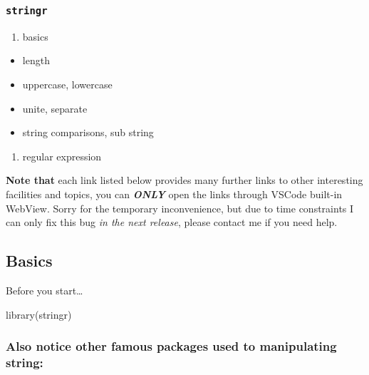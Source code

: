 \documentclass[
]{article}
\newenvironment{Shaded}{}{}
\newcommand{\FunctionTok}[1]{\textcolor[rgb]{0.02,0.16,0.49}{#1}}
\newcommand{\NormalTok}[1]{#1}
\begin{document}
\hypertarget{stringr}{%
\subsubsection{\texorpdfstring{\texttt{stringr}}{stringr}}\label{stringr}}

\begin{enumerate}
\def\labelenumi{\arabic{enumi}.}
\item
  basics
\end{enumerate}

\begin{itemize}
\item
  length
\item
  uppercase, lowercase
\item
  unite, separate
\item
  string comparisons, sub string
\end{itemize}

\begin{enumerate}
\def\labelenumi{\arabic{enumi}.}
\item
  regular expression
\end{enumerate}

\textbf{Note that} each link listed below provides many further links to
other interesting facilities and topics, you can \emph{\textbf{ONLY}}
open the links through VSCode built-in WebView. Sorry for the temporary
inconvenience, but due to time constraints I can only fix this bug
\emph{in the next release}, please contact me if you need help.

\hypertarget{basics}{%
\subsection{Basics}\label{basics}}

Before you start\ldots{}

\begin{Shaded}
\begin{Highlighting}[]
\FunctionTok{library}\NormalTok{(stringr)}
\end{Highlighting}
\end{Shaded}

\hypertarget{also-notice-other-famous-packages-used-to-manipulating-string}{%
\subsubsection{Also notice other famous packages used to manipulating
string:}\label{also-notice-other-famous-packages-used-to-manipulating-string}}
\end{document}
